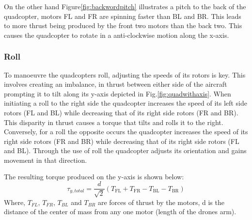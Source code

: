 \documentclass{article}
\begin{document}
On the other hand Figure\ref{fig:backwordpitch} illustrates a pitch to the back
of the quadcopter, motors FL and FR are spinning faster than BL and BR. This
leads to more thrust being produced by the front two motors than the back two.
This causes the quadcopter to rotate in a anti-clockwise motion along the
x-axis.

\subsubsection{Roll}
To manoeuvre the quadcopters roll, adjusting the speeds of its rotors is key.
This involves creating an imbalance, in thrust between either side of the
aircraft prompting it to tilt along its  y-axis depicted in
Fig.\ref{fig:quadwithaxis}. When initiating a roll to the right side the
quadcopter increases the speed of its left side rotors (FL and BL) while
decreasing that of its right side rotors (FR and BR). This disparity in thrust
causes a torque that tilts and rolls it to the right. Conversely, for a roll the
opposite occurs the quadcopter increases the speed of its right side rotors (FR
and BR) while decreasing that of its right side rotors (FL and BL). Through the
use of roll the quadcopter adjusts its orientation and gains movement in that
direction. 

The resulting torque produced on the y-axis is shown below:
\begin{equation}
  \tau_{y, total} = \frac{d}{\sqrt{2}} (T_{\text{FL}} + T_{\text{FR}} - T_{\text{BL}} - T_{\text{BR}})
  \label{torque_y}
\end{equation}
Where, \(T_{FL}\),  \(T_{FR}\), \(T_{BL}\) and \(T_{BR}\) are forces of thrust
by the motors, d is the distance of the center of mass from any one motor
(length of the drones arm).
\end{document}
